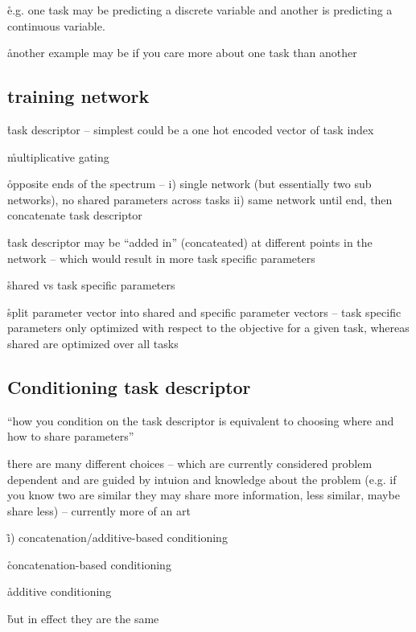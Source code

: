 \r{e.g. one task may be predicting a discrete variable and another is predicting a continuous variable.}

\r{another example may be if you care more about one task than another}

\subsection{training network}

\r{task descriptor -- simplest could be a one hot encoded vector of task index}


\r{multiplicative gating}

\r{opposite ends of the spectrum -- i) single network (but essentially two sub networks), no shared parameters across tasks ii) same network until end, then concatenate task descriptor}


\r{task descriptor may be ``added in'' (concateated) at different points in the network -- which would result in more task specific parameters}


\r{shared vs task specific parameters}

\r{split parameter vector into shared and specific parameter vectors --  task specific parameters only optimized with respect to the objective for a given task, whereas shared are optimized over all tasks}

\subsection{Conditioning task descriptor}

\r{``how you condition on the task descriptor is equivalent to choosing where and how to share parameters''}

\r{there are many different choices -- which are currently considered problem dependent and are guided by intuion and knowledge about the problem (e.g. if you know two are similar they may share more information, less similar, maybe share less) -- currently more of an art}

\r{i) concatenation/additive-based conditioning}

\r{concatenation-based conditioning}


\r{additive conditioning}


\r{but in effect they are the same}

